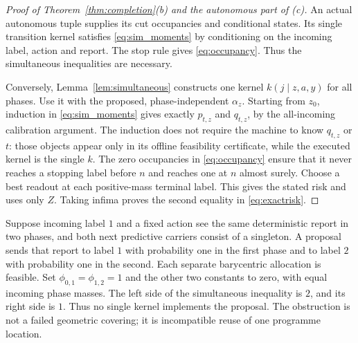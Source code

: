 \begin{proof}[Proof of Theorem~\ref{thm:completion}(b) and the autonomous part of (c)]
An actual autonomous tuple supplies its cut occupancies and conditional states. Its single transition kernel satisfies \eqref{eq:sim_moments} by conditioning on the incoming label, action and report. The stop rule gives \eqref{eq:occupancy}. Thus the simultaneous inequalities are necessary.

Conversely, Lemma~\ref{lem:simultaneous} constructs one kernel $k(j\mid z,a,y)$ for all phases. Use it with the proposed, phase-independent $\alpha_z$. Starting from $z_0$, induction in \eqref{eq:sim_moments} gives exactly $p_{t,z}$ and $q_{t,z}$, by the all-incoming calibration argument. The induction does not require the machine to know $q_{t,z}$ or $t$: those objects appear only in its offline feasibility certificate, while the executed kernel is the single $k$. The zero occupancies in \eqref{eq:occupancy} ensure that it never reaches a stopping label before $n$ and reaches one at $n$ almost surely. Choose a best readout at each positive-mass terminal label. This gives the stated risk and uses only $Z$. Taking infima proves the second equality in \eqref{eq:exactrisk}.
\end{proof}

\begin{remark}\label{rem:gluing}
Suppose incoming label $1$ and a fixed action see the same deterministic report in two phases, and both next predictive carriers consist of a singleton. A proposal sends that report to label $1$ with probability one in the first phase and to label $2$ with probability one in the second. Each separate barycentric allocation is feasible. Set $\phi_{0,1}=\phi_{1,2}=1$ and the other two constants to zero, with equal incoming phase masses. The left side of the simultaneous inequality is $2$, and its right side is $1$. Thus no single kernel implements the proposal. The obstruction is not a failed geometric covering; it is incompatible reuse of one programme location.
\end{remark}

